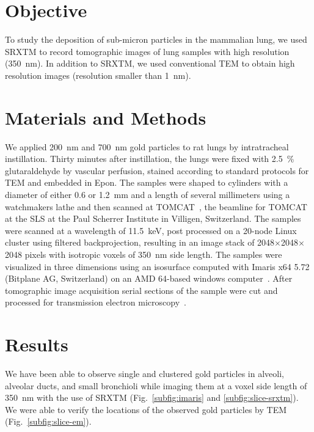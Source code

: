 \section{Objective}
To study the deposition of sub-micron particles in the mammalian lung, we used \ac{SRXTM} to record tomographic images of lung samples with high resolution (\SI{350}{\nano\meter}). In addition to \ac{SRXTM}, we used conventional \ac{TEM} to obtain high resolution images (resolution smaller than \SI{1}{\nano\meter}).

\section{Materials and Methods}
We applied \SI{200}{\nano\meter} and \SI{700}{\nano\meter} gold particles to rat lungs by intratracheal instillation. Thirty minutes after instillation, the lungs were fixed with \SI{2.5}{\%} glutaraldehyde by vascular perfusion, stained according to standard protocols for \ac{TEM} and embedded in Epon. The samples were shaped to cylinders with a diameter of either 0.6 or \SI{1.2}{\milli\meter} and a length of several millimeters using a watchmakers lathe and then scanned at \ac{TOMCAT}~\cite{Stampanoni2007}, the beamline for \acl{TOMCAT} at the \acl{SLS} at the Paul Scherrer Institute in Villigen, Switzerland. The samples were scanned at a wavelength of \SI{11.5}{\kilo\electronvolt}, post processed on a 20-node Linux cluster using filtered backprojection, resulting in an image stack of 2048$\times$2048$\times$2048 pixels with isotropic voxels of \SI{350}{\nano\meter} side length. The samples were visualized in three dimensions using an isosurface computed with Imaris x64 5.72 (Bitplane AG, Switzerland) on an AMD 64-based windows computer~\cite{Tsuda2008}. After tomographic image acquisition serial sections of the sample were cut and processed for transmission electron microscopy~\cite{Mund2008}. 

\section{Results}
We have been able to observe single and clustered gold particles in alveoli, alveolar ducts, and small bronchioli while imaging them at a voxel side length of \SI{350}{\nano\meter} with the use of \ac{SRXTM} (Fig.~\ref{subfig:imaris} and \ref{subfig:slice-srxtm}). We were able to verify the locations of the observed gold particles by \ac{TEM} (Fig.~\ref{subfig:slice-em}). 

